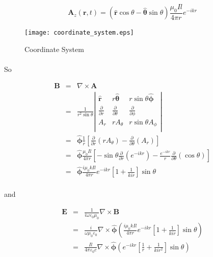 \documentclass[a4paper,10pt]{thesis}
\begin{document}
\begin{equation}\label{simple_potential_solution_timeharmonic_sherical_ref}
 \mathbf{A}_z (\mathbf{r},t) = (\mathbf{\hat{r}} \cos \theta - \mathbf{\hat{\theta}} \sin \theta) \frac{\mu_0 I l}{4 \pi r} e^{-ikr }
\end{equation}

\begin{center}
\begin{figure}
  \texttt{[image: coordinate\_system.eps]}\\
\caption{Coordinate System}\label{fig_coordinate_system}
\end{figure}
\end{center}
\newpage
\paragraph*{}
So

\begin{eqnarray} \label{get_B_hd}
\mathbf{B}&=&\nabla \times \mathbf{A} \\
&=&\frac{1}{r^2 \sin \theta}\left|%
\begin{array}{ccc}
 \mathbf{ \hat{r}} & r\mathbf{\hat{\theta}} & r \sin \theta \mathbf{\hat{\phi}} \\
  \frac{\partial }{\partial r} & \frac{\partial }{\partial \theta } & \frac{\partial }{\partial \phi } \\
  A_r & rA_{\theta } & r \sin \theta A_{\phi} \\
\end{array}%
\right|\\
&=&\mathbf{ \hat{\phi}} \frac{1}{r} \left[ \frac{\partial }{\partial r} \left( rA_\theta \right) - \frac{\partial }{\partial \theta } (A_r)\right] \nonumber \\
&=& \mathbf{\hat{\phi}}\frac{\mu_0 I l}{4 \pi r} \left[ -\sin \theta \frac{\partial }{\partial r} \left(   e^{-ikr } \right) - \frac{e^{-ikr }}{r} \frac{\partial }{\partial \theta } (\cos \theta )\right] \nonumber \\
&=& \mathbf{\hat{\phi}} \frac{i \mu_0 k I l}{4 \pi r} e^{-ikr } \left[ 1+ \frac{1}{kir}\right] \sin \theta \nonumber
\end{eqnarray}

\paragraph*{}
and

\begin{eqnarray} \label{get_E_hd}
\mathbf{E}&=& \frac{1}{i\omega \varepsilon_0 \mu_0} \nabla \times \mathbf{B} \\
&=&\frac{i}{ \omega \mu_0 \varepsilon_0} \nabla \times\mathbf{ \hat{\phi}} \left( \frac{i \mu_0 k I l}{4 \pi r} e^{-ikr } \left[ 1+ \frac{1}{kir}\right] \sin \theta \right) \\
&=&\frac{  I l}{4 \pi \varepsilon_0 c} \nabla \times \mathbf{\hat{\phi}} \left( e^{-ikr } \left[  \frac{ 1}{ r}+ \frac{1}{kir^2}\right] \sin \theta \right)
\end{eqnarray}
\end{document}

